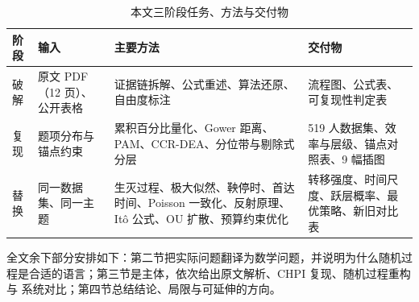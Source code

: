 \begin{table}[htbp]
\centering
\tabfont
\caption{本文三阶段任务、方法与交付物}
\label{tab:route}
\begin{tabularx}{\textwidth}{@{}p{1.5cm}p{3.7cm}Xp{3.6cm}@{}}
\toprule
阶段 & 输入 & 主要方法 & 交付物 \\
\midrule
破解 & 原文 PDF（12 页）、
公开表格 & 证据链拆解、公式重述、算法还原、自由度标注 &
  流程图、公式表、可复现性判定表 \\
复现 & 题项分布与锚点约束 &
  累积百分比量化、Gower 距离、PAM、CCR-DEA、分位带与剔除式分层 &
  519 人数据集、效率与层级、锚点对照表、9 幅插图 \\
替换 & 同一数据集、同一主题 &
  生灭过程、极大似然、鞅停时、首达时间、Poisson 一致化、反射原理、Itô 公式、OU 扩散、预算约束优化 &
  转移强度、时间尺度、跃层概率、最优策略、新旧对比表 \\
\bottomrule
\end{tabularx}
\end{table}

全文余下部分安排如下：第二节把实际问题翻译为数学问题，并说明为什么随机过
程是合适的语言；第三节是主体，依次给出原文解析、CHPI 复现、随机过程重构与
系统对比；第四节总结结论、局限与可延伸的方向。

